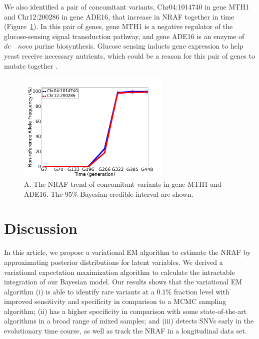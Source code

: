 \documentclass[11pt,reqno]{amsart}
\begin{document}
We also identified a pair of concomitant variants, Chr04:1014740 in gene MTH1 and Chr12:200286 in gene ADE16, that increase in NRAF together in time (Figure~\ref{tbl:concomitant}).
In this pair of genes, gene MTH1 is a negative regulator of the glucose-sensing signal transduction pathway, and gene ADE16 is an enzyme of $\mathit{de \quad  novo}$ purine biosynthesis.
Glucose sensing inducts gene expression to help yeast receive necessary nutrients, which could be a reason for this pair of genes to mutate together \citep{johnston1999feasting}.
\begin{figure}[htbp]
\centering
\includegraphics[width=0.65\textwidth]{figs/concomitant.png}
\caption{A. The NRAF trend of concomitant variants in gene MTH1 and ADE16.
The 95\% Bayesian credible interval are shown.}
\label{tbl:concomitant}
\end{figure}
\section{Discussion}
In this article, we propose a variational EM algorithm to estimate the NRAF by approximating posterior distributions for latent variables.
We derived a variational expectation maximization algorithm to calculate the intractable integration of our Bayesian model.
Our results shows that the variational EM algorithm
(i) is able to identify rare variants at a 0.1\% fraction level with improved sensitivity and specificity in comparison to a MCMC sampling algorithm;
(ii) has a higher specificity in comparison with some state-of-the-art algorithms in a broad range of mixed samples;
and (iii) detects SNVs early in the evolutionary time course, as well as track the NRAF in a longitudinal data set.
\end{document}
